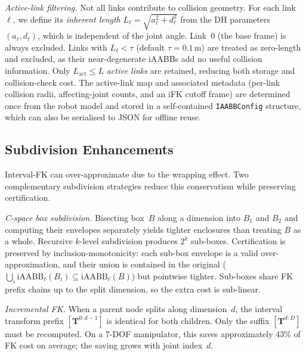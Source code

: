 \documentclass[journal]{IEEEtran}
\newcommand{\iAABB}{\text{iAABB}}
\newcommand{\bT}{\mathbf{T}}
\begin{document}
\emph{Active-link filtering.}
Not all links contribute to collision geometry.
For each link~$\ell$, we define its \emph{inherent length}
$L_\ell = \sqrt{a_\ell^2 + d_\ell^2}$ from the DH
parameters~$(a_\ell, d_\ell)$, which is independent of the joint
angle.
Link~0 (the base frame) is always excluded.
Links with $L_\ell < \tau$ (default $\tau = 0.1\,\text{m}$) are
treated as zero-length and excluded, as their near-degenerate
iAABBs add no useful collision information.
Only $L_\text{act} \leq L$ \emph{active links} are retained, reducing
both storage and collision-check cost.
The active-link map and associated metadata (per-link collision
radii, affecting-joint counts, and an iFK cutoff frame) are
determined once from the robot model and stored
in a self-contained \texttt{IAABBConfig} structure,
which can also be serialised to JSON for offline reuse.

\subsection{Subdivision Enhancements}\label{sec:subdivision}

Interval-FK can over-approximate due to the wrapping effect.
Two complementary subdivision strategies reduce this conservatism while
preserving certification.

\emph{C-space box subdivision.}
Bisecting box~$B$ along a dimension into $B_1$ and $B_2$ and computing
their envelopes separately yields tighter enclosures than treating $B$
as a whole.
Recursive $k$-level subdivision produces $2^k$ sub-boxes.
Certification is preserved by inclusion-monotonicity:
each sub-box envelope is a valid over-approximation, and their union
is contained in the original ($\bigcup_i \iAABB_\ell(B_i) \subseteq \iAABB_\ell(B)$)
but pointwise tighter.
Sub-boxes share FK prefix chains up to the split dimension,
so the extra cost is sub-linear.

\emph{Incremental FK.}
When a parent node splits along dimension~$d$, the interval transform
prefix $[\bT^{0:d-1}]$ is identical for both children.
Only the suffix $[\bT^{d:D}]$ must be recomputed.
On a 7-DOF manipulator, this saves approximately 43\% of FK cost on
average; the saving grows with joint index~$d$.
\end{document}
